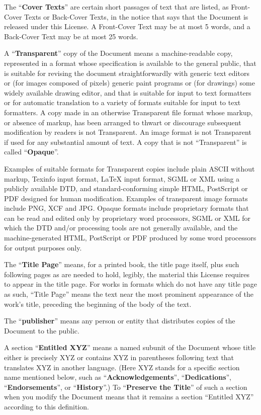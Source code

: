 \documentclass[11pt]{book}
\numberwithin{example}{chapter}
\begin{document}
The ``\textbf{Cover Texts}'' are certain short passages of text that are listed,
as Front-Cover Texts or Back-Cover Texts, in the notice that says that
the Document is released under this License.  A Front-Cover Text may
be at most 5 words, and a Back-Cover Text may be at most 25 words.

A ``\textbf{Transparent}'' copy of the Document means a machine-readable copy,
represented in a format whose specification is available to the
general public, that is suitable for revising the document
straightforwardly with generic text editors or (for images composed of
pixels) generic paint programs or (for drawings) some widely available
drawing editor, and that is suitable for input to text formatters or
for automatic translation to a variety of formats suitable for input
to text formatters.  A copy made in an otherwise Transparent file
format whose markup, or absence of markup, has been arranged to thwart
or discourage subsequent modification by readers is not Transparent.
An image format is not Transparent if used for any substantial amount
of text.  A copy that is not ``Transparent'' is called ``\textbf{Opaque}''.

Examples of suitable formats for Transparent copies include plain
ASCII without markup, Texinfo input format, LaTeX input format, SGML
or XML using a publicly available DTD, and standard-conforming simple
HTML, PostScript or PDF designed for human modification.  Examples of
transparent image formats include PNG, XCF and JPG.  Opaque formats
include proprietary formats that can be read and edited only by
proprietary word processors, SGML or XML for which the DTD and/or
processing tools are not generally available, and the
machine-generated HTML, PostScript or PDF produced by some word
processors for output purposes only.

The ``\textbf{Title Page}'' means, for a printed book, the title page itself,
plus such following pages as are needed to hold, legibly, the material
this License requires to appear in the title page.  For works in
formats which do not have any title page as such, ``Title Page'' means
the text near the most prominent appearance of the work's title,
preceding the beginning of the body of the text.

The ``\textbf{publisher}'' means any person or entity that distributes
copies of the Document to the public.

A section ``\textbf{Entitled XYZ}'' means a named subunit of the Document whose
title either is precisely XYZ or contains XYZ in parentheses following
text that translates XYZ in another language.  (Here XYZ stands for a
specific section name mentioned below, such as ``\textbf{Acknowledgements}'',
``\textbf{Dedications}'', ``\textbf{Endorsements}'', or ``\textbf{History}''.)  
To ``\textbf{Preserve the Title}''
of such a section when you modify the Document means that it remains a
section ``Entitled XYZ'' according to this definition.
\end{document}
